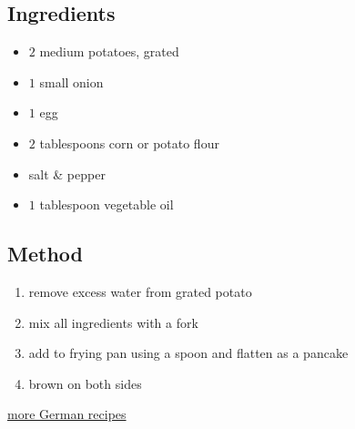 \documentclass[11pt,a4paper]{article}
\begin{document}
\subsection*{Ingredients}

\begin{multicols}{2}

\begin{itemize}
  \item $ 2 $ medium potatoes, grated
  \item $ 1 $ small onion
  \item $ 1 $ egg
  \item $ 2 $ tablespoons corn or potato flour
  \item salt \& pepper
\end{itemize}

\columnbreak

\begin{itemize}
  \item $ 1 $ tablespoon vegetable oil
\end{itemize}

\end{multicols}

\medskip

\subsection*{Method}

\begin{enumerate}
  \item remove excess water from grated potato
  \item mix all ingredients with a fork
  \item add to frying pan using a spoon and flatten as a pancake
  \item brown on both sides
\end{enumerate}

\href{https://www.daringgourmet.com/traditional-kartoffelpuffer-reibekuchen-german-potato-pancakes/}{more German recipes}
\end{document}
